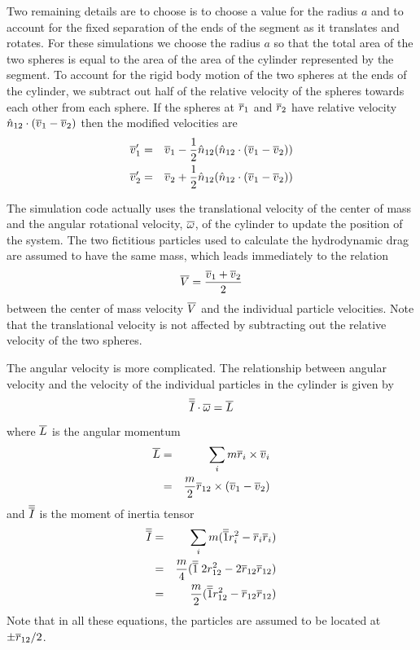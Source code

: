 \documentclass[12pt]{article}
\begin{document}
Two remaining details are to choose is to choose a value for the radius $a$ and
to account for the fixed separation of the ends of the segment as it translates
and rotates. For these simulations
we choose the radius $a$ so that the total area of the two spheres is equal to the
area of the area of the cylinder represented by the segment.
To account for the rigid body motion of the two spheres at the ends of the
cylinder, we subtract out half of the relative velocity of the spheres towards each
other from each sphere. If the spheres at $\overline{r}_1$ and $\overline{r}_2$ have relative
 velocity
$\hat{n}_{12}\cdot(\overline{v}_1-\overline{v}_2)$ then the modified velocities are
\begin{eqnarray*}
\overline{v}'_1 & = & \overline{v}_1 - \frac{1}{2}\hat{n}_{12}(\hat{n}_{12}\cdot(\overline{v}_1-\overline{v}_2)) \\
\overline{v}'_2 & = & \overline{v}_2 + \frac{1}{2}\hat{n}_{12}(\hat{n}_{12}\cdot(\overline{v}_1-\overline{v}_2))
\end{eqnarray*}

The simulation code actually uses the translational velocity of the center of mass and
the angular rotational velocity, $\overline{\omega}$, of the cylinder to update the position of the system.
The two fictitious particles used to  calculate the hydrodynamic drag are assumed to
have the same mass, which leads immediately to the relation
\[
\overline{V} = \frac{\overline{v}_1+\overline{v}_2}{2}
\]
between the center of mass velocity $\overline{V}$ and the individual particle velocities.
Note that the translational velocity is not affected by subtracting out the
relative velocity of the two spheres.

The angular velocity is more complicated. The relationship between angular velocity
and the velocity of the individual particles in the cylinder is given by
\[
\overline{\overline{I}}\cdot\overline{\omega} = \overline{L}
\]
where $\overline{L}$ is the angular momentum
\begin{eqnarray*}
\overline{L} & = & \sum_i m\overline{r}_i\times\overline{v}_i\\
& = & \frac{m}{2}\overline{r}_{12}\times(\overline{v}_1-\overline{v}_2)
\end{eqnarray*}
and $\overline{\overline{I}}$ is the moment of inertia tensor
\begin{eqnarray*}
\overline{\overline{I}} & = & \sum_i m (\overline{\overline{1}} r_i^2-\overline{r}_i\overline{r}_i) \\
& = & \frac{m}{4}(\overline{\overline{1}}\; 2r_{12}^2-2\overline{r}_{12}\overline{r}_{12}) \\
& = & \frac{m}{2}(\overline{\overline{1}} r_{12}^2-\overline{r}_{12}\overline{r}_{12}) \\
\end{eqnarray*}
Note that in all these equations, the particles are assumed to be located at
$\pm \overline{r}_{12}/2$.
\end{document}
